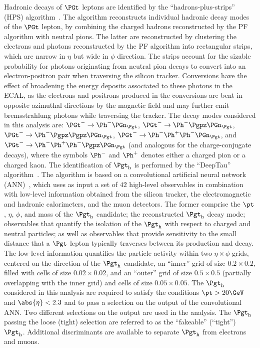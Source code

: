 Hadronic decays of $\PGt$ leptons are identified by the ``hadrons-plus-strips'' (HPS) algorithm~\cite{Sirunyan:2018pgf}.
The algorithm reconstructs individual hadronic decay modes of the $\PGt$ lepton,
by combining the charged hadrons reconstructed by the PF algorithm with neutral pions.
The latter are reconstructed by clustering the electrons and photons reconstructed by the PF algorithm into rectangular strips,
which are narrow in $\eta$ but wide in $\phi$ direction.
The strips account for the sizable probability for photons originating from neutral pion decays
to convert into an electron-positron pair when traversing the silicon tracker.
Conversions have the effect of broadening the energy deposits associated to these photons in the ECAL,
as the electrons and positrons produced in the conversions are bent in opposite azimuthal directions by the magnetic field
and may further emit bremsstrahlung photons while traversing the tracker.
The decay modes considered in this analysis are:
$\PGt^{-} \to \Ph^{-}\Pnut$, $\PGt^{-} \to \Ph^{-}\Ppizero\Pnut$, $\PGt^{-} \to \Ph^{-}\Ppizero\Ppizero\Pnut$, 
$\PGt^{-} \to \Ph^{-}\Ph^{+}\Ph^{-}\Pnut$, and $\PGt^{-} \to \Ph^{-}\Ph^{+}\Ph^{-}\Ppizero\Pnut$
(and analogous for the charge-conjugate decays),
where the symbols $\Ph^{-}$ and $\Ph^{+}$ denotes either a charged pion or a charged kaon.
The identification of $\tauh$ is performed by the ``DeepTau'' algorithm~\cite{CMS-DP-2019-033}.
The algorithm is based on a convolutional artificial neural network (ANN)~\cite{lecun1989},
which uses as input a set of $42$ high-level observables in combination with low-level information obtained from the silicon tracker, the electromagnetic and hadronic calorimeters, and the muon detectors.
The former comprise the $\pt$, $\eta$, $\phi$, and mass of the $\tauh$ candidate; the reconstructed $\tauh$ decay mode;
observables that quantify the isolation of the $\tauh$ with respect to charged and neutral particles;
as well as observables that provide sensitivity to the small distance that a $\Pgt$ lepton typically traverses between its production and decay.
The low-level information quantifies the particle activity within two $\eta \times \phi$ grids, centered on the direction of the $\tauh$ candidate,
an ``inner'' grid of size $0.2 \times 0.2$, filled with cells of size $0.02 \times 0.02$,
and an ``outer'' grid of size $0.5 \times 0.5$ (partially overlapping with the inner grid) and cells of size $0.05 \times 0.05$.
The $\tauh$ considered in this analysis are required to satisfy the conditions $\pt > 20\GeV$ and $\abs{\eta} < 2.3$ 
and to pass a selection on the output of the convolutional ANN.
Two different selections on the output are used in the analysis.
The $\tauh$ passing the loose (tight) selection are referred to as the ``fakeable'' (``tight'') $\tauh$.
Additional discriminants are available to separate $\tauh$ from electrons and muons.


